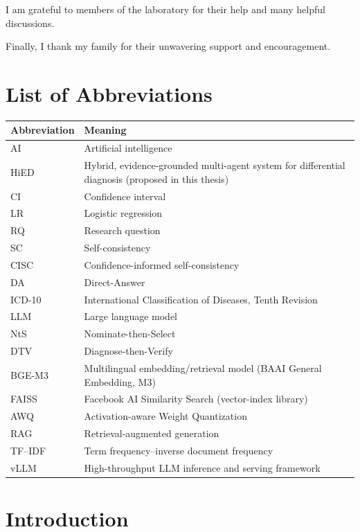 \documentclass[12pt,a4paper,oneside]{report}
\begin{document}
I am grateful to members of the laboratory for their help and many
helpful discussions.

Finally, I thank my family for their unwavering support and
encouragement.
\chapter*{List of Abbreviations}
\begin{longtable}{|p{3cm}|p{10cm}|}
\hline Abbreviation & Meaning\\ \hline
AI & Artificial intelligence\\
\hline
HiED & Hybrid, evidence-grounded multi-agent system for differential diagnosis (proposed in this thesis)\\
\hline
CI & Confidence interval\\
\hline
LR & Logistic regression\\
\hline
RQ & Research question\\
\hline
SC & Self-consistency\\
\hline
CISC & Confidence-informed self-consistency\\
\hline
DA & Direct-Answer\\
\hline
ICD-10 & International Classification of Diseases, Tenth Revision\\
\hline
LLM & Large language model\\
\hline
NtS & Nominate-then-Select\\
\hline
DTV & Diagnose-then-Verify\\
\hline
BGE-M3 & Multilingual embedding/retrieval model (BAAI General Embedding, M3)\\
\hline
FAISS & Facebook AI Similarity Search (vector-index library)\\
\hline
AWQ & Activation-aware Weight Quantization\\
\hline
RAG & Retrieval-augmented generation\\
\hline
TF--IDF & Term frequency--inverse document frequency\\
\hline
vLLM & High-throughput LLM inference and serving framework\\
\hline
\end{longtable}
\clearpage
\tableofcontents
\clearpage
\listoftables
\clearpage
\listoffigures
\clearpage
{}

\chapter{Introduction}
\label{ch:introduction}
\end{document}
